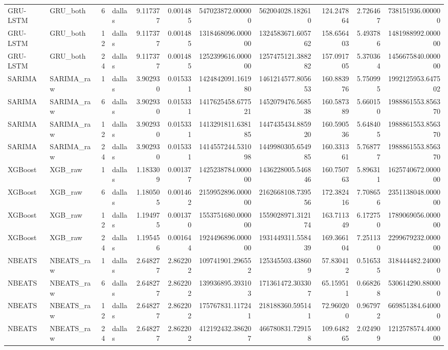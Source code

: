 \begin{longtable}{llrlrrrrrrr}
GRU-LSTM & GRU\_both & 6 & dallas & 9.117377 & 0.001485 & 547023872.000000 & 562004028.182610 & 124.247864 & 2.726467 & 738151936.000000 \\
GRU-LSTM & GRU\_both & 12 & dallas & 9.117377 & 0.001485 & 1318468096.000000 & 1324583671.605762 & 158.656403 & 5.493786 & 1481988992.000000 \\
GRU-LSTM & GRU\_both & 24 & dallas & 9.117377 & 0.001485 & 1252399616.000000 & 1257475121.388282 & 157.091705 & 5.370364 & 1456675840.000000 \\
SARIMA & SARIMA\_raw & 1 & dallas & 3.902930 & 0.015331 & 1424842091.161980 & 1461214577.805653 & 160.883976 & 5.750995 & 1992125953.647502 \\
SARIMA & SARIMA\_raw & 6 & dallas & 3.902930 & 0.015331 & 1417625458.677521 & 1452079476.568538 & 160.587389 & 5.660150 & 1988861553.856370 \\
SARIMA & SARIMA\_raw & 12 & dallas & 3.902930 & 0.015331 & 1413291811.638185 & 1447435434.885920 & 160.590536 & 5.648405 & 1988861553.856370 \\
SARIMA & SARIMA\_raw & 24 & dallas & 3.902930 & 0.015331 & 1414557244.531098 & 1449980305.654985 & 160.331361 & 5.768777 & 1988861553.856370 \\
XGBoost & XGB\_raw & 1 & dallas & 1.183309 & 0.001377 & 1425238784.000000 & 1436228005.546846 & 160.750763 & 5.896311 & 1625740672.000000 \\
XGBoost & XGB\_raw & 6 & dallas & 1.180505 & 0.001462 & 2159952896.000000 & 2162668108.739556 & 172.382416 & 7.708656 & 2351138048.000000 \\
XGBoost & XGB\_raw & 12 & dallas & 1.194975 & 0.001370 & 1553751680.000000 & 1559028971.312174 & 163.711349 & 6.172750 & 1789069056.000000 \\
XGBoost & XGB\_raw & 24 & dallas & 1.195456 & 0.001644 & 1924496896.000000 & 1931449311.558439 & 169.366104 & 7.251130 & 2299679232.000000 \\
NBEATS & NBEATS\_raw & 1 & dallas & 2.648277 & 2.862202 & 109741901.296552 & 125345503.438609 & 57.830412 & 0.516535 & 318444482.240000 \\
NBEATS & NBEATS\_raw & 6 & dallas & 2.648277 & 2.862202 & 139936895.393103 & 171361472.303307 & 65.159511 & 0.668268 & 530614290.880000 \\
NBEATS & NBEATS\_raw & 12 & dallas & 2.648277 & 2.862202 & 175767831.117241 & 218188360.595141 & 72.960200 & 0.967972 & 669851384.640000 \\
NBEATS & NBEATS\_raw & 24 & dallas & 2.648277 & 2.862202 & 412192432.386207 & 466780831.729158 & 109.648265 & 2.024909 & 1212578574.400000 \\

\end{longtable}
